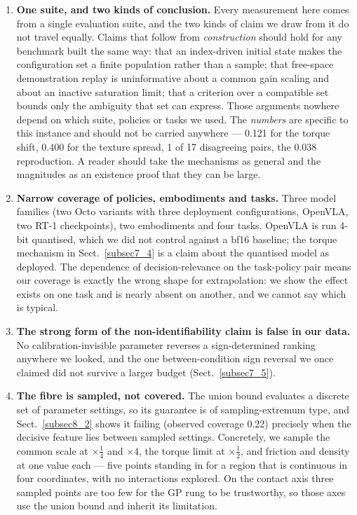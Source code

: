 \documentclass[pdflatex,iicol,sn-apa]{sn-jnl}
\theoremstyle{remark}
\begin{document}
\begin{enumerate}
\item \textbf{One suite, and two kinds of conclusion.} Every measurement here comes from a single
evaluation suite, and the two kinds of claim we draw from it do not travel equally. Claims that
follow from \emph{construction} should hold for any benchmark built the same way: that an
index-driven initial state makes the configuration set a finite population rather than a sample;
that free-space demonstration replay is uninformative about a common gain scaling and about
an inactive saturation limit; that a criterion over a compatible set bounds only the ambiguity that
set can express. Those arguments nowhere depend on which suite, policies or tasks we used. The
\emph{numbers} are specific to this instance and should not be carried anywhere --- 0.121 for the
torque shift, 0.400 for the texture spread, 1 of 17 disagreeing pairs, the 0.038 reproduction. A
reader should take the mechanisms as general and the magnitudes as an existence proof that they can
be large.

\item \textbf{Narrow coverage of policies, embodiments and tasks.} Three model families (two Octo
variants with three deployment configurations, OpenVLA, two RT-1 checkpoints), two embodiments and
four tasks. OpenVLA is run 4-bit quantised, which we did not control against a bf16 baseline; the
torque mechanism in Sect.~\ref{subsec7_4} is a claim about the quantised model as deployed. The
dependence of decision-relevance on the task-policy pair means our coverage is exactly the wrong
shape for extrapolation: we show the effect exists on one task and is nearly absent on another, and
we cannot say which is typical.

\item \textbf{The strong form of the non-identifiability claim is false in our data.} No
calibration-invisible parameter reverses a sign-determined ranking anywhere we looked, and the one
between-condition sign reversal we once claimed did not survive a larger budget
(Sect.~\ref{subsec7_5}).

\item \textbf{The fibre is sampled, not covered.} The union bound evaluates a discrete set of
parameter settings, so its guarantee is of sampling-extremum type, and Sect.~\ref{subsec8_2} shows
it failing (observed coverage 0.22) precisely when the decisive feature lies between sampled
settings. Concretely, we sample the common scale at $\times\tfrac14$ and $\times 4$, the torque
limit at $\times\tfrac12$, and friction and density at one value each --- five points standing in
for a region that is continuous in four coordinates, with no interactions explored. On the contact
axis three sampled points are too few for the GP rung to be trustworthy, so those axes use the union
bound and inherit its limitation.


\end{enumerate}
\end{document}

